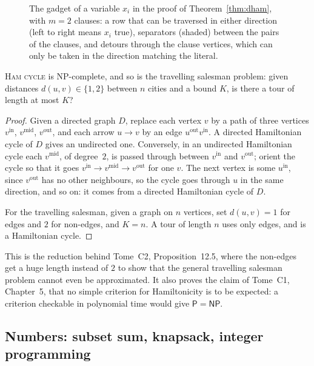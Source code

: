 \begin{figure}[ht]
\centering
{}
\caption{The gadget of a variable $x_i$ in the proof of Theorem~\ref{thm:dham}, with $m=2$ clauses: a row that can be traversed in either direction (left to right means $x_i$ true), separators (shaded) between the pairs of the clauses, and detours through the clause vertices, which can only be taken in the direction matching the literal.}
\label{fig:hamrow}
\end{figure}

\begin{corollary}\label{cor:ham}
\textup{\textsc{Ham cycle}} is NP-complete, and so is the travelling salesman problem: given distances $d(u,v)\in\{1,2\}$ between $n$ cities and a bound $K$, is there a tour of length at most $K$?
\end{corollary}

\begin{proof}
Given a directed graph $D$, replace each vertex $v$ by a path of three vertices $v^{\mathrm{in}}$, $v^{\mathrm{mid}}$, $v^{\mathrm{out}}$, and each arrow $u\to v$ by an edge $u^{\mathrm{out}}v^{\mathrm{in}}$. A directed Hamiltonian cycle of $D$ gives an undirected one. Conversely, in an undirected Hamiltonian cycle each $v^{\mathrm{mid}}$, of degree~$2$, is passed through between $v^{\mathrm{in}}$ and $v^{\mathrm{out}}$; orient the cycle so that it goes $v^{\mathrm{in}}\to v^{\mathrm{mid}}\to v^{\mathrm{out}}$ for one $v$. The next vertex is some $u^{\mathrm{in}}$, since $v^{\mathrm{out}}$ has no other neighbours, so the cycle goes through $u$ in the same direction, and so on: it comes from a directed Hamiltonian cycle of $D$.

For the travelling salesman, given a graph on $n$ vertices, set $d(u,v)=1$ for edges and $2$ for non-edges, and $K=n$. A tour of length $n$ uses only edges, and is a Hamiltonian cycle.
\end{proof}

This is the reduction behind Tome~C2, Proposition~12.5, where the non-edges get a huge length instead of $2$ to show that the general travelling salesman problem cannot even be approximated. It also proves the claim of Tome~C1, Chapter~5, that no simple criterion for Hamiltonicity is to be expected: a criterion checkable in polynomial time would give $\mathsf P=\mathsf{NP}$.

\subsection*{Numbers: subset sum, knapsack, integer programming}

